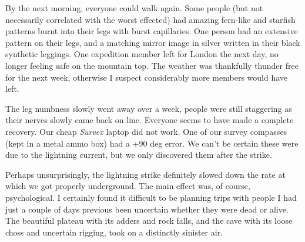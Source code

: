 
By the next morning, everyone could walk again. Some people (but not necessarily correlated with the worst effected) had amazing fern-like and starfish patterns burnt into their legs with burst capillaries. One person had an extensive pattern on their legs, and a matching mirror image in silver written in their black synthetic leggings. One expedition member left for London the next day, no longer feeling safe on the mountain top. The weather was thankfully thunder free for the next week, otherwise I suspect considerably more members would have left. 

The leg numbness slowly went away over a week, people were still staggering as their nerves slowly came back on line. Everyone seems to have made a complete recovery. Our cheap \emph{Survex} laptop did not work. One of our survey compasses (kept in a metal ammo box) had a +90 deg error. We can't be certain these were due to the lightning current, but we only discovered them after the strike.

Perhaps unsurprisingly, the lightning strike definitely slowed down the rate at which we got properly underground.  The main effect was, of course, psychological. I certainly found it difficult to be planning trips with people I had just a couple of days previous been uncertain whether they were dead or alive. The beautiful plateau with its adders and rock falls, and the cave with its loose choss and uncertain rigging, took on a distinctly sinister air.

